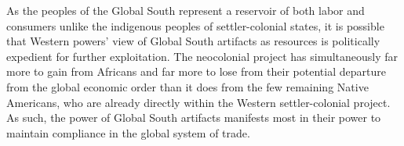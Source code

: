 \documentclass[american]{../../../coursework}
\begin{document}
As the peoples of the Global South represent a reservoir of both labor and
consumers unlike the indigenous peoples of settler-colonial states, it is
possible that Western powers' view of Global South artifacts as resources is
politically expedient for further exploitation. The neocolonial project has
simultaneously far more to gain from Africans and far more to lose from their
potential departure from the global economic order than it does from the few
remaining Native Americans, who are already directly within the Western
settler-colonial project. As such, the power of Global South artifacts
manifests most in their power to maintain compliance in the global system of
trade.

\printbibliography
\end{document}
